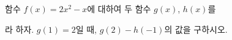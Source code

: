 함수 $f(x)=2x^2-x$에 대하여 두 함수 $g(x)$, $h(x)$를 \par\smallskip{}\par\smallskip\noindent 라 하자. $g(1)=2$일 때, $g(2)-h(-1)$의 값을 구하시오.
